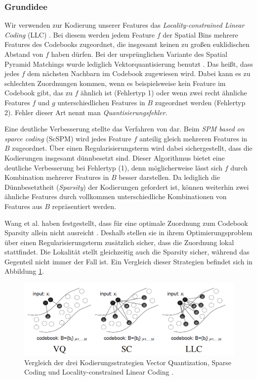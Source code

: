 \subsubsection{Grundidee}

Wir verwenden zur Kodierung unserer Features das \emph{Locality-constrained Linear Coding} (LLC) \cite{wyylhg10}. Bei diesem werden jedem Feature $f$ der Spatial Bins mehrere Features des Codebooks zugeordnet, die insgesamt keinen zu großen euklidischen Abstand von $f$ haben dürfen. Bei der ursprünglichen Variante des Spatial Pyramid Matchings wurde lediglich Vektorquantisierung benutzt \cite{lsp06}. Das heißt, dass jedes $f$ dem nächsten Nachbarn im Codebook zugewiesen wird. Dabei kann es zu schlechten Zuordnungen kommen, wenn es beispielsweise kein Feature im Codebook gibt, das zu $f$ ähnlich ist (Fehlertyp 1) oder wenn zwei recht ähnliche Features $f$ und $g$ unterschiedlichen Features in $B$ zugeordnet werden (Fehlertyp 2). Fehler dieser Art nennt man \emph{Quantisierungsfehler}.

Eine deutliche Verbesserung stellte das Verfahren von \cite{yygh09} dar. Beim \emph{SPM based on sparce coding} (ScSPM) wird jedes Feature $f$ anteilig gleich mehreren Features in $B$ zugeordnet. Über einen Regularisierungsterm wird dabei sichergestellt, dass die Kodierungen insgesamt dünnbesetzt sind. Dieser Algorithmus bietet eine deutliche Verbesserung bei Fehlertyp (1), denn möglicherweise lässt sich $f$ durch Kombination mehrerer Features in $B$ besser darstellen. Da lediglich die Dünnbesetztheit (\emph{Sparsity}) der Kodierungen gefordert ist, können weiterhin zwei ähnliche Features durch vollkommen unterschiedliche Kombinationen von Features aus $B$ repräsentiert werden.

Wang et al. haben festgestellt, dass für eine optimale Zuordnung zum Codebook Sparsity allein nicht ausreicht \cite{wyylhg10}. Deshalb stellen sie in ihrem Optimierungsproblem über einen Regularisierungsterm zusätzlich sicher, dass die Zuordnung lokal stattfindet. Die Lokalität stellt gleichzeitig auch die Sparsity sicher, während das Gegenteil nicht immer der Fall ist. Ein Vergleich dieser Strategien befindet sich in Abbildung \ref{img:quant_comp}.

\begin{figure}
	\centering
	\includegraphics[scale=0.5]{img/quant_comp.png}
	\caption{Vergleich der drei Kodierungsstrategien Vector Quantization, Sparse Coding und Locality-constrained Linear Coding \cite{wyylhg10}.}
	\label{img:quant_comp}
\end{figure}

